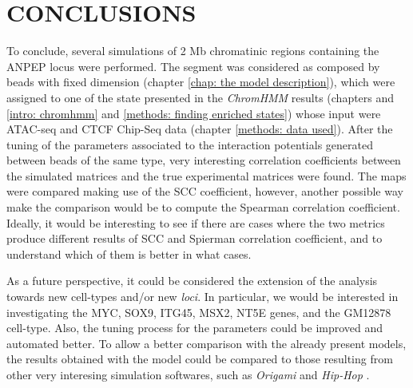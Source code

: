 \section{CONCLUSIONS}
To conclude, several simulations of 2 Mb chromatinic regions containing the ANPEP locus were performed. The segment was considered as composed by beads with fixed dimension (chapter \ref{chap: the model description}), which were assigned to one of the state presented in the \textit{ChromHMM} results (chapters and \ref{intro: chromhmm} and \ref{methods: finding enriched states}) whose input were ATAC-seq and CTCF Chip-Seq data (chapter \ref{methods: data used}). After the tuning of the parameters associated to the interaction potentials generated between beads of the same type, very interesting correlation coefficients between the simulated matrices and the true experimental matrices were found. %
The maps were compared making use of the SCC coefficient, however, another possible way make the comparison would be to compute the Spearman correlation coefficient. Ideally, it would be interesting to see if there are cases where the two metrics produce different results of SCC and Spierman correlation coefficient, and to understand which of them is better in what cases.

As a future perspective, it could be considered the extension of the analysis towards new cell-types and/or new \textit{loci}. In particular, we would be interested in investigating the MYC, SOX9, ITG45, MSX2, NT5E genes, and the GM12878 cell-type. Also, the tuning process for the parameters could be improved and automated better.
To allow a better comparison with the already present models, the results obtained with the model could be compared to those resulting from other very interesing simulation softwares, such as \textit{Origami} and \textit{Hip-Hop}
\cite{bucklePolymerSimulationsHeteromorphic2018,tanCelltypespecificPrediction3D2023}.

